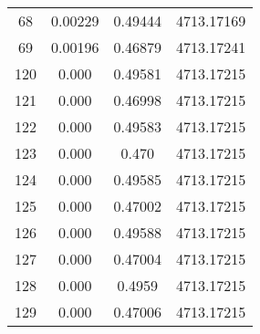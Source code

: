 \documentclass{article}
\begin{document}
\begin{table}[htbp]
\begin{tabular}{cccc}
68 & 0.00229 & 0.49444 & 4713.17169 \\
69 & 0.00196 & 0.46879 & 4713.17241 \\
\midrule
120 & 0.000 & 0.49581 & 4713.17215 \\
121 & 0.000 & 0.46998 & 4713.17215 \\
122 & 0.000 & 0.49583 & 4713.17215 \\
123 & 0.000 & 0.470 & 4713.17215 \\
124 & 0.000 & 0.49585 & 4713.17215 \\
125 & 0.000 & 0.47002 & 4713.17215 \\
126 & 0.000 & 0.49588 & 4713.17215 \\
127 & 0.000 & 0.47004 & 4713.17215 \\
128 & 0.000 & 0.4959 & 4713.17215 \\
129 & 0.000 & 0.47006 & 4713.17215 \\
\bottomrule
\end{tabular}
\end{table}
\end{document}
